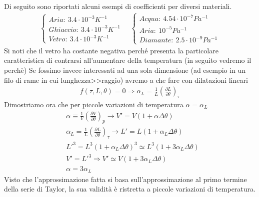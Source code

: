 \documentclass[10pt,a4paper]{article}
\begin{document}
Di seguito sono riportati alcuni esempi di coefficienti per diversi materiali. 
\begin{align*} 
	\begin{cases}
		Aria:\ 3.4\cdot10^{-3} K^{-1}\\
		Ghiaccio:\ 3.4\cdot10^{-3} K^{-1}\\
		Vetro:\ 3.4\cdot10^{-3} K^{-1}
	\end{cases} \quad
	\begin{cases}
		Acqua:\ 4.54\cdot 10^{-7} Pa^{-1}\\
		Aria:\ 10^{-5} Pa^{-1}\\
		Diamante:\ 2.5 \cdot 10^{-9} Pa^{-1}
	\end{cases}
\end{align*} 
Si noti che il vetro ha costante negativa perché presenta la particolare caratteristica di contrarsi all'aumentare della temperatura (in seguito vedremo il perchè)
Se fossimo invece interessati ad una sola dimensione (ad esempio in un filo di rame in cui lunghezza>>raggio) avremo a che fare con dilatazioni lineari
\begin{align*} 
	f(\tau, L, \theta) = 0 \Rightarrow \alpha_L = \frac{1}{L}(\frac{\partial L}{\partial \theta})_{\tau}
\end{align*} 
Dimostriamo ora che per piccole variazioni di temperatura $\alpha = \alpha_L$
\begin{align*} 
	&\alpha \equiv \frac{1}{V} (\frac{\partial V}{\partial \theta})_p \rightarrow V' = V(1 + \alpha \Delta \theta)\\
	&\alpha_L = \frac{1}{L}(\frac{\partial L}{\partial \theta})_{\tau} \rightarrow L' = L(1 + \alpha_L \Delta \theta)\\
	&L'^{3} = L^3 (1 + \alpha_L \Delta \theta)^3 \simeq L^3 (1+3\alpha_L \Delta \theta)\\
	&V' = L'^3 \Rightarrow V' \simeq V (1 + 3 \alpha_L \Delta \theta)\\
	&\alpha = 3\alpha_L
\end{align*} 
Visto che l'approssimazione fatta si basa sull'approssimazione al primo termine della serie di Taylor, la sua validità è ristretta a piccole variazioni di temperatura.\\
\end{document}
